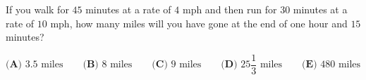 If you walk for $45$ minutes at a rate of $4$ mph and then run for $30$ minutes at a rate of $10$ mph, how many miles will you have gone at the end of one hour and $15$ minutes?

$\textbf{(A) }3.5\text{ miles}\qquad\textbf{(B) }8\text{ miles}\qquad\textbf{(C) }9\text{ miles}\qquad\textbf{(D) }25\dfrac13\text{ miles}\qquad\textbf{(E) }480\text{ miles}$
